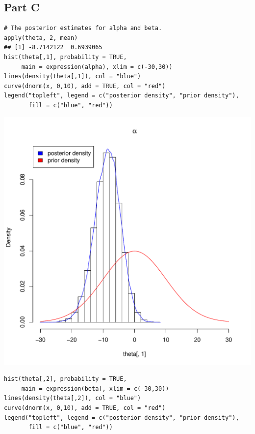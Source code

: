 \documentclass{article}\usepackage[]{graphicx}\usepackage[]{color}
\makeatletter
\newenvironment{kframe}{%
 \def\at@end@of@kframe{}%
 \ifinner\ifhmode%
  \def\at@end@of@kframe{\end{minipage}}%
  \begin{minipage}{\columnwidth}%
 \fi\fi%
 \def\FrameCommand##1{\hskip\@totalleftmargin \hskip-\fboxsep
 \colorbox{shadecolor}{##1}\hskip-\fboxsep
     \hskip-\linewidth \hskip-\@totalleftmargin \hskip\columnwidth}%
 \MakeFramed {\advance\hsize-\width
   \@totalleftmargin\z@ \linewidth\hsize
   \@setminipage}}%
 {\par\unskip\endMakeFramed%
 \at@end@of@kframe}
\newenvironment{knitrout}{}{} %
\makeatother
\begin{document}
\subsection*{Part C}
\begin{knitrout}
\color{fgcolor}\begin{kframe}
\begin{verbatim}
# The posterior estimates for alpha and beta.
apply(theta, 2, mean)
## [1] -8.7142122  0.6939065
hist(theta[,1], probability = TRUE,
     main = expression(alpha), xlim = c(-30,30))
lines(density(theta[,1]), col = "blue")
curve(dnorm(x, 0,10), add = TRUE, col = "red")
legend("topleft", legend = c("posterior density", "prior density"), 
       fill = c("blue", "red"))
\end{verbatim}
\end{kframe}
\includegraphics[width=1\linewidth]{figure/unnamed-chunk-12-1} 
\begin{kframe}\begin{verbatim}
hist(theta[,2], probability = TRUE, 
     main = expression(beta), xlim = c(-30,30))
lines(density(theta[,2]), col = "blue")
curve(dnorm(x, 0,10), add = TRUE, col = "red")
legend("topleft", legend = c("posterior density", "prior density"), 
       fill = c("blue", "red"))
\end{verbatim}

\end{kframe}
\end{knitrout}
\end{document}
